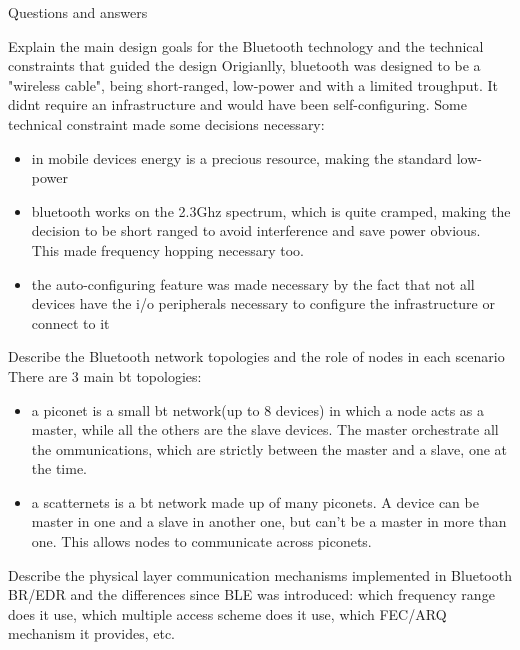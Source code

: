 \begin{section}{Questions and answers}
  \begin{subsubsection}{Explain the main design goals for the Bluetooth technology and the technical
    constraints that guided the design}
    Origianlly, bluetooth was designed to be a "wireless cable", being short-ranged, low-power and
    with a limited troughput. It didnt require an infrastructure and would have been
    self-configuring.
    Some technical constraint made some decisions necessary:
    \begin{itemize}
      \item in mobile devices energy is a precious resource, making the standard low-power 
      \item bluetooth works on the 2.3Ghz spectrum, which is quite cramped, making the decision to
        be short ranged to avoid interference and save power obvious. This made frequency hopping
        necessary too.
      \item the auto-configuring feature was made necessary by the fact that not all devices have
        the i/o peripherals necessary to configure the infrastructure or connect to it 
    \end{itemize}
  \end{subsubsection}
  \begin{subsubsection}{Describe the Bluetooth network topologies and the role of nodes in each
    scenario}
    There are 3 main bt topologies:
    \begin{itemize}
      \item a piconet is a small bt network(up to 8 devices) in which a node acts as a master, while
        all the others are the slave devices. The master orchestrate all the ommunications, which
        are strictly between the master and a slave, one at the time.
      \item a scatternets is a bt network made up of many piconets. A device can be master in one
        and a slave in another one, but can't be a master in more than one. This allows nodes to
        communicate across piconets.
    \end{itemize}
  \end{subsubsection}
  \begin{subsubsection}{Describe the physical layer communication mechanisms implemented in
      Bluetooth BR/EDR and the differences since BLE was introduced: which frequency range does it
    use, which multiple access scheme does it use, which FEC/ARQ mechanism it provides, etc.}
  \end{subsubsection}

\end{section}
